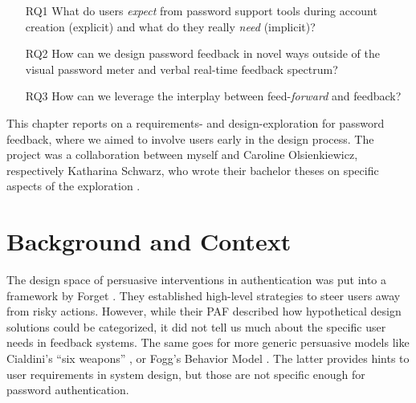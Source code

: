 \begin{itemize}
	\item[RQ1] What do users \textit{expect} from password support tools during account creation (explicit) and what do they really \textit{need} (implicit)?
	\item[RQ2] How can we design password feedback in novel ways outside of the visual password meter and verbal real-time feedback spectrum? %
	\item[RQ3] How can we leverage the interplay between feed-\textit{forward} and feedback?
\end{itemize}


This chapter reports on a requirements- and design-exploration for password feedback, where we aimed to involve users early in the design process. The project was a collaboration between myself and Caroline Olsienkiewicz, respectively Katharina Schwarz, who wrote their bachelor theses on specific aspects of the exploration \cite{Olsienkiewicz2016BAThesis, Schwarz2016BAThesis}.

\section{Background and Context}

The design space of persuasive interventions in authentication was put into a framework by Forget \etal \cite{Forget2007PersuasionEducationSecurity}. They established high-level strategies to steer users away from risky actions. However, while their \acrlong{PAF} described how hypothetical design solutions could be categorized, it did not tell us much about the specific user needs in feedback systems. The same goes for more generic persuasive models like Cialdini's ``six weapons'' \cite{Cialdini2007Influence}, or Fogg's Behavior Model \cite{Fogg2009BehavioralModel}. The latter provides hints to user requirements in system design, but those are not specific enough for password authentication.

